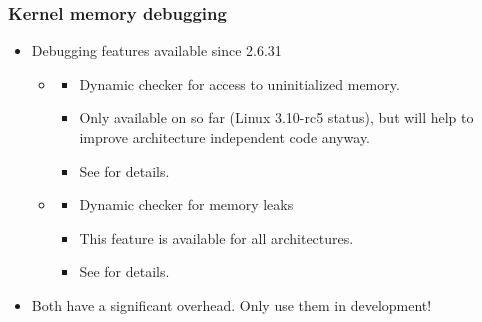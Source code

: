 \begin{frame}
  \frametitle{Kernel memory debugging}
  \begin{itemize}
  \item Debugging features available since 2.6.31
    \begin{itemize}
    \item {}
      \begin{itemize}
      \item Dynamic checker for access to uninitialized memory.
      \item Only available on  so far (Linux 3.10-rc5 status), but will
        help to improve architecture independent code anyway.
      \item See  for details.
      \end{itemize}
    \item {}
      \begin{itemize}
      \item Dynamic checker for memory leaks
      \item This feature is available for all architectures.
      \item See  for details.
      \end{itemize}
    \end{itemize}
  \item Both have a significant overhead. Only use them in development!
  \end{itemize}
\end{frame}
